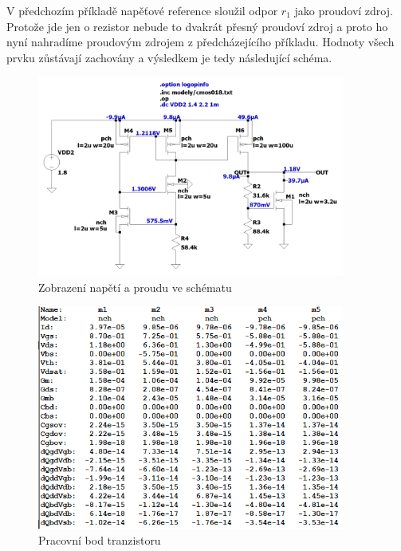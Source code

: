 V předchozím příkladě napěťové reference sloužil odpor \(r_1\) jako proudoví zdroj.
Protože jde jen o rezistor nebude to dvakrát přesný proudoví zdroj a proto ho nyní nahradíme proudovým zdrojem z předcházejícího příkladu.
Hodnoty všech prvku zůstávají zachovány a výsledkem je tedy následující schéma.

\begin{figure}[h!]
    \centering
    \includegraphics[width=0.9\textwidth]{text/img/LNR-op-sch.png}
    \caption{\label{fig:LNR-op-sch} Zobrazení napětí a proudu ve schématu}
\end{figure}

\vspace{10mm}
\begin{figure}[h!]
    \centering
    \includegraphics[width=0.9\textwidth]{text/img/LNR-op-ol.png}
    \caption{\label{fig:LNR-op-ol} Pracovní bod tranzistoru}
\end{figure}

